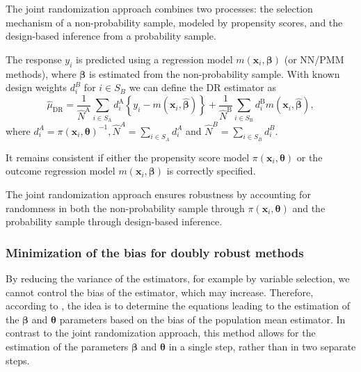 \documentclass[
]{jss}
\begin{document}
The joint randomization approach combines two processes: the selection
mechanism of a non-probability sample, modeled by propensity scores, and
the design-based inference from a probability sample.

The response \(y_i\) is predicted using a regression model
\(m(\boldsymbol{x}_i, \boldsymbol{\beta})\) (or NN/PMM methods), where
\(\boldsymbol{\beta}\) is estimated from the non-probability sample.
With known design weights \(d_i^B\) for \(i \in S_B\) we can define the
DR estimator as \begin{equation}
\label{dr}
\hat{\mu}_{\mathrm{DR}}=\frac{1}{\hat{N}^{\mathrm{A}}} \sum_{i \in S_{\mathrm{A}}} d_i^{\mathrm{A}}\left\{y_i-m\left(\boldsymbol{x}_i, \hat{\boldsymbol{\beta}}\right)\right\}+\frac{1}{\hat{N}^{\mathrm{B}}} \sum_{i \in S_{\mathrm{B}}} d_i^{\mathrm{B}} m\left(\boldsymbol{x}_i, \hat{\boldsymbol{\beta}}\right),
\end{equation} where
\(d_i^A=\pi\left(\boldsymbol{x}_i, \boldsymbol{\theta}\right)^{-1}, \hat{N}^A=\sum_{i \in S_A} d_i^A\)
and \(\hat{N}^B=\sum_{i \in S_B} d_i^B\).

It remains consistent if either the propensity score model
\(\pi(\boldsymbol{x}_i, \boldsymbol{\theta})\) or the outcome regression
model \(m(\boldsymbol{x}_i, \boldsymbol{\beta})\) is correctly
specified.

The joint randomization approach ensures robustness by accounting for
randomness in both the non-probability sample through
\(\pi(\boldsymbol{x}_i, \boldsymbol{\theta})\) and the probability
sample through design-based inference.

\hypertarget{minimization-of-the-bias-for-doubly-robust-methods}{%
\subsubsection{Minimization of the bias for doubly robust
methods}\label{minimization-of-the-bias-for-doubly-robust-methods}}

By reducing the variance of the estimators, for example by variable
selection, we cannot control the bias of the estimator, which may
increase. Therefore, according to \citet{yang_doubly_2020}, the idea is
to determine the equations leading to the estimation of the
\(\boldsymbol{\beta}\) and \(\boldsymbol{\theta}\) parameters based on
the bias of the population mean estimator. In contrast to the joint
randomization approach, this method allows for the estimation of the
parameters \(\boldsymbol{\beta}\) and \(\boldsymbol{\theta}\) in a
single step, rather than in two separate steps.
\end{document}
